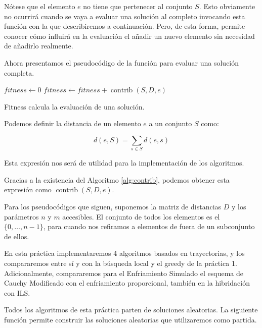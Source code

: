 \documentclass{article}
\begin{document}
Nótese que el elemento $e$ no tiene que pertenecer al conjunto $S$. Esto obviamente no ocurrirá cuando se vaya a evaluar una solución
al completo invocando esta función con la que describiremos a continuación. Pero, de esta forma, permite conocer cómo influirá en la evaluación el añadir
 un nuevo elemento sin necesidad de añadirlo realmente. 
 
 Ahora presentamos el pseudocódigo de la función para evaluar una solución completa.
 
 \begin{algorithm}[H]
 	\DontPrintSemicolon %
 	$fitness \gets 0$\;
 	 {
 		$fitness \gets fitness + \operatorname{contrib}(S,D,e)$ 
 	}
 	 
 	\caption{{\sc Fitness} calcula la evaluación de una solución.}
 	\label{alg:eval}
 \end{algorithm}

Podemos definir la distancia de un elemento $e$ a un conjunto $S$ como:

\begin{equation} \label{eq:distance-elem-set}
	d(e,S)=\sum_{s\in S} d(e,s)
\end{equation}

Esta expresión nos será de utilidad para la implementación de los algoritmos.

Gracias a la existencia del Algoritmo \ref{alg:contrib}, podemos obtener esta expresión como $\operatorname{contrib}(S,D,e)$.

Para los pseudocódigos que siguen, suponemos la matriz de distancias $D$ y los parámetros $n$ y $m$ accesibles. El
conjunto de todos los elementos es el $\{0,\ldots , n-1\}$, para cuando nos refiramos a elementos de fuera de un
 subconjunto
de ellos.

En esta práctica implementaremos 4 algoritmos basados en trayectorias, y los compararemos entre sí y con la búsqueda local y el greedy de la práctica 1.
Adicionalmente, compararemos para el Enfriamiento Simulado el esquema de Cauchy Modificado con el enfriamiento proporcional, también en la
hibridación con ILS.

Todos los algoritmos de esta práctica parten de soluciones aleatorias. La siguiente función permite construir
las soluciones aleatorias que utilizaremos como partida.
\end{document}
